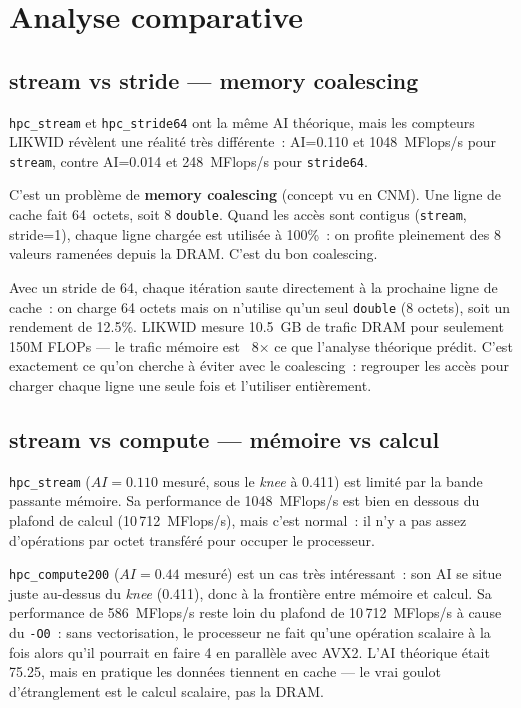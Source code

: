 \documentclass[a4paper,12pt]{article}
\begin{document}
\newpage

\section{Analyse comparative}

\subsection{stream vs stride — memory coalescing}

\texttt{hpc\_stream} et \texttt{hpc\_stride64} ont la même AI théorique, mais les compteurs
LIKWID révèlent une réalité très différente~: AI=0.110 et 1048~MFlops/s pour \texttt{stream},
contre AI=0.014 et 248~MFlops/s pour \texttt{stride64}.

C'est un problème de \textbf{memory coalescing} (concept vu en CNM). Une ligne de cache
fait 64~octets, soit 8 \texttt{double}. Quand les accès sont contigus (\texttt{stream},
stride=1), chaque ligne chargée est utilisée à 100\%~: on profite pleinement des 8 valeurs
ramenées depuis la DRAM. C'est du bon coalescing.

Avec un stride de 64, chaque itération saute directement à la prochaine ligne de cache~:
on charge 64 octets mais on n'utilise qu'un seul \texttt{double} (8 octets), soit un rendement
de 12.5\%. LIKWID mesure 10.5~GB de trafic DRAM pour seulement 150M FLOPs — le trafic
mémoire est ~8× ce que l'analyse théorique prédit. C'est exactement ce qu'on cherche à
éviter avec le coalescing~: regrouper les accès pour charger chaque ligne une seule fois
et l'utiliser entièrement.

\subsection{stream vs compute — mémoire vs calcul}

\texttt{hpc\_stream} ($AI = 0.110$ mesuré, sous le \textit{knee} à 0.411) est limité par la
bande passante mémoire. Sa performance de 1048~MFlops/s est bien en dessous du plafond de
calcul (10\,712~MFlops/s), mais c'est normal~: il n'y a pas assez d'opérations par octet
transféré pour occuper le processeur.

\texttt{hpc\_compute200} ($AI = 0.44$ mesuré) est un cas très intéressant~: son AI se
situe juste au-dessus du \textit{knee} (0.411), donc à la frontière entre mémoire et
calcul. Sa performance de 586~MFlops/s reste loin du plafond de 10\,712~MFlops/s à cause
du \texttt{-O0}~: sans vectorisation, le processeur ne fait qu'une opération scalaire à la
fois alors qu'il pourrait en faire 4 en parallèle avec AVX2. L'AI théorique était 75.25,
mais en pratique les données tiennent en cache — le vrai goulot d'étranglement est le calcul
scalaire, pas la DRAM.
\end{document}
